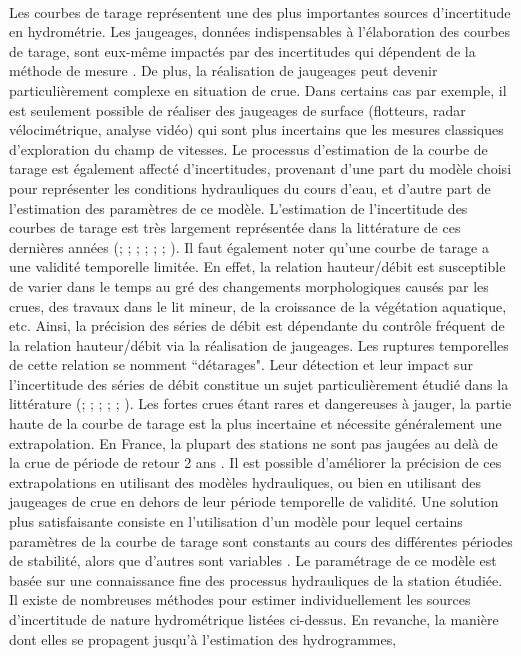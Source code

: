 	\paragraph{} Les courbes de tarage représentent une des plus importantes sources d'incertitude en hydrométrie. Les jaugeages, données indispensables à l'élaboration des courbes de tarage, sont eux-même impactés par des incertitudes qui dépendent de la méthode de mesure \citep{lecoz_quantification_2014}. De plus, la réalisation de jaugeages peut devenir particulièrement complexe en situation de crue. Dans certains cas par exemple, il est seulement possible de réaliser des jaugeages de surface (flotteurs, radar vélocimétrique, analyse vidéo) qui sont plus incertains que les mesures classiques d'exploration du champ de vitesses. Le processus d'estimation de la courbe de tarage est également affecté d'incertitudes, provenant d'une part du modèle choisi pour représenter les conditions hydrauliques du cours d'eau, et d'autre part de l'estimation des paramètres de ce modèle. L'estimation de l'incertitude des courbes de tarage est très largement représentée dans la littérature de ces dernières années (\cite{petersen-overleir_bayesian_2009}; \cite{juston_rating_2014}; \cite{le_coz_combining_2014}; \cite{morlot_dynamic_2014}; \cite{coxon_novel_2015}; \cite{mcmillan_rating_2015}; \cite{mansanarez_rapid_2019}). Il faut également noter qu'une courbe de tarage a une validité temporelle limitée. En effet, la relation hauteur/débit est susceptible de varier dans le temps au gré des changements morphologiques causés par les crues, des travaux dans le lit mineur, de la croissance de la végétation aquatique, etc. Ainsi, la précision des séries de débit est dépendante du contrôle fréquent de la relation hauteur/débit via la réalisation de jaugeages. Les ruptures temporelles de cette relation se nomment ``détarages". Leur détection et leur impact sur l'incertitude des séries de débit constitue un sujet particulièrement étudié dans la littérature (\cite{mcmillan_impacts_2010}; \cite{westerberg_stage-discharge_2011}; \cite{guerrero_temporal_2012}; \cite{morlot_dynamic_2014}; \cite{lapuszek_methods_2015};  \cite{darienzo_detection_2021}). Les fortes crues étant rares et dangereuses à jauger, la partie haute de la courbe de tarage est la plus incertaine et nécessite généralement une extrapolation. En France, la plupart des stations ne sont pas jaugées au delà de la crue de période de retour 2 ans \citep{lang_extrapolation_2010}. Il est possible d'améliorer la précision de ces extrapolations en utilisant des modèles hydrauliques, ou bien en utilisant des jaugeages de crue en dehors de leur période temporelle de validité. Une solution plus satisfaisante consiste en l'utilisation d'un modèle pour lequel certains paramètres de la courbe de tarage sont constants au cours des différentes périodes de stabilité, alors que d'autres sont variables \citep{mansanarez_shift_2019}. Le paramétrage de ce modèle est basée sur une connaissance fine des processus hydrauliques de la station étudiée. Il existe de nombreuses méthodes pour estimer individuellement les sources d'incertitude de nature hydrométrique listées ci-dessus. En revanche, la manière dont elles se propagent jusqu'à l'estimation des hydrogrammes, 